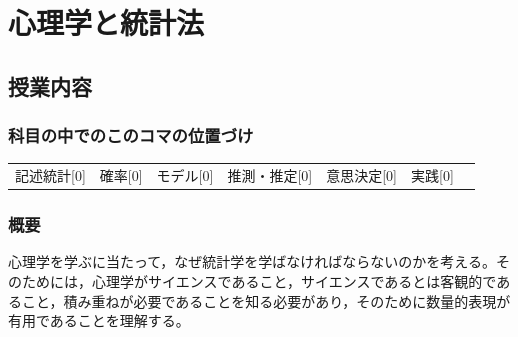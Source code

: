 \section{心理学と統計法}
\label{lesson01}
\subsection{授業内容}
\subsubsection{科目の中でのこのコマの位置づけ}
\begin{tabular}[t]{ccccccc}
記述統計[0] & 確率[0] & モデル[0] & 推測・推定[0] & 意思決定[0] & 実践[0]
\end{tabular}
\subsubsection{概要}
心理学を学ぶに当たって，なぜ統計学を学ばなければならないのかを考える。そのためには，心理学がサイエンスであること，サイエンスであるとは客観的であること，積み重ねが必要であることを知る必要があり，そのために数量的表現が有用であることを理解する。
